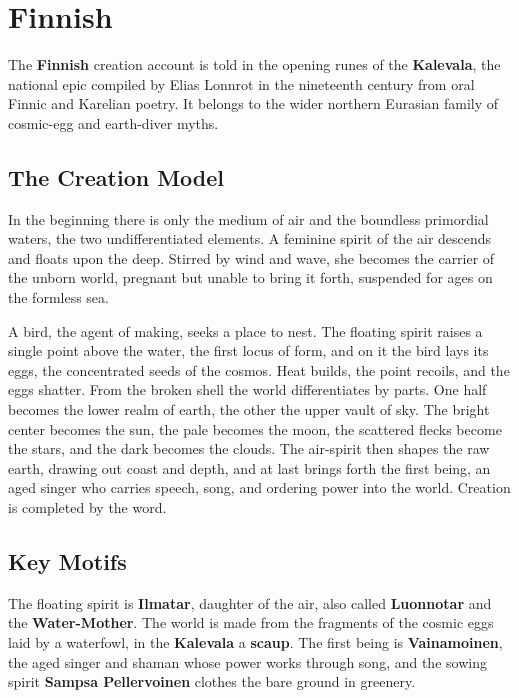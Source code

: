 \section{Finnish}

The \textbf{Finnish} creation account is told in the opening runes of the \textbf{Kalevala}, the national epic compiled by Elias Lonnrot in the nineteenth century from oral Finnic and Karelian poetry. It belongs to the wider northern Eurasian family of cosmic-egg and earth-diver myths.

\subsection{The Creation Model}

In the beginning there is only the medium of air and the boundless primordial waters, the two undifferentiated elements. A feminine spirit of the air descends and floats upon the deep. Stirred by wind and wave, she becomes the carrier of the unborn world, pregnant but unable to bring it forth, suspended for ages on the formless sea.

A bird, the agent of making, seeks a place to nest. The floating spirit raises a single point above the water, the first locus of form, and on it the bird lays its eggs, the concentrated seeds of the cosmos. Heat builds, the point recoils, and the eggs shatter. From the broken shell the world differentiates by parts. One half becomes the lower realm of earth, the other the upper vault of sky. The bright center becomes the sun, the pale becomes the moon, the scattered flecks become the stars, and the dark becomes the clouds. The air-spirit then shapes the raw earth, drawing out coast and depth, and at last brings forth the first being, an aged singer who carries speech, song, and ordering power into the world. Creation is completed by the word.

\subsection{Key Motifs}

The floating spirit is \textbf{Ilmatar}, daughter of the air, also called \textbf{Luonnotar} and the \textbf{Water-Mother}. The world is made from the fragments of the cosmic eggs laid by a waterfowl, in the \textbf{Kalevala} a \textbf{scaup}. The first being is \textbf{Vainamoinen}, the aged singer and shaman whose power works through song, and the sowing spirit \textbf{Sampsa Pellervoinen} clothes the bare ground in greenery.

